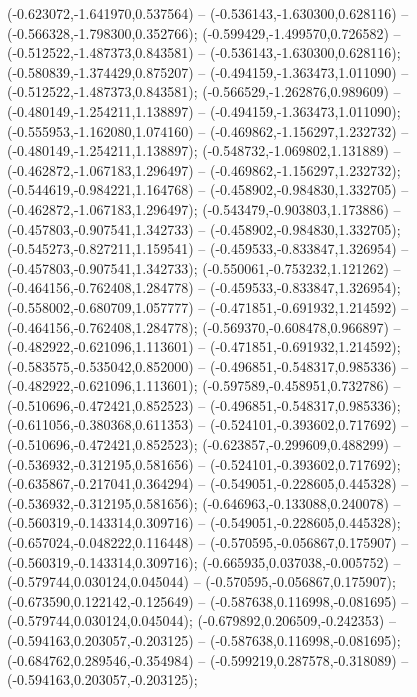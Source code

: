  (-0.623072,-1.641970,0.537564) -- (-0.536143,-1.630300,0.628116) -- (-0.566328,-1.798300,0.352766);
 (-0.599429,-1.499570,0.726582) -- (-0.512522,-1.487373,0.843581) -- (-0.536143,-1.630300,0.628116);
 (-0.580839,-1.374429,0.875207) -- (-0.494159,-1.363473,1.011090) -- (-0.512522,-1.487373,0.843581);
 (-0.566529,-1.262876,0.989609) -- (-0.480149,-1.254211,1.138897) -- (-0.494159,-1.363473,1.011090);
 (-0.555953,-1.162080,1.074160) -- (-0.469862,-1.156297,1.232732) -- (-0.480149,-1.254211,1.138897);
 (-0.548732,-1.069802,1.131889) -- (-0.462872,-1.067183,1.296497) -- (-0.469862,-1.156297,1.232732);
 (-0.544619,-0.984221,1.164768) -- (-0.458902,-0.984830,1.332705) -- (-0.462872,-1.067183,1.296497);
 (-0.543479,-0.903803,1.173886) -- (-0.457803,-0.907541,1.342733) -- (-0.458902,-0.984830,1.332705);
 (-0.545273,-0.827211,1.159541) -- (-0.459533,-0.833847,1.326954) -- (-0.457803,-0.907541,1.342733);
 (-0.550061,-0.753232,1.121262) -- (-0.464156,-0.762408,1.284778) -- (-0.459533,-0.833847,1.326954);
 (-0.558002,-0.680709,1.057777) -- (-0.471851,-0.691932,1.214592) -- (-0.464156,-0.762408,1.284778);
 (-0.569370,-0.608478,0.966897) -- (-0.482922,-0.621096,1.113601) -- (-0.471851,-0.691932,1.214592);
 (-0.583575,-0.535042,0.852000) -- (-0.496851,-0.548317,0.985336) -- (-0.482922,-0.621096,1.113601);
 (-0.597589,-0.458951,0.732786) -- (-0.510696,-0.472421,0.852523) -- (-0.496851,-0.548317,0.985336);
 (-0.611056,-0.380368,0.611353) -- (-0.524101,-0.393602,0.717692) -- (-0.510696,-0.472421,0.852523);
 (-0.623857,-0.299609,0.488299) -- (-0.536932,-0.312195,0.581656) -- (-0.524101,-0.393602,0.717692);
 (-0.635867,-0.217041,0.364294) -- (-0.549051,-0.228605,0.445328) -- (-0.536932,-0.312195,0.581656);
 (-0.646963,-0.133088,0.240078) -- (-0.560319,-0.143314,0.309716) -- (-0.549051,-0.228605,0.445328);
 (-0.657024,-0.048222,0.116448) -- (-0.570595,-0.056867,0.175907) -- (-0.560319,-0.143314,0.309716);
 (-0.665935,0.037038,-0.005752) -- (-0.579744,0.030124,0.045044) -- (-0.570595,-0.056867,0.175907);
 (-0.673590,0.122142,-0.125649) -- (-0.587638,0.116998,-0.081695) -- (-0.579744,0.030124,0.045044);
 (-0.679892,0.206509,-0.242353) -- (-0.594163,0.203057,-0.203125) -- (-0.587638,0.116998,-0.081695);
 (-0.684762,0.289546,-0.354984) -- (-0.599219,0.287578,-0.318089) -- (-0.594163,0.203057,-0.203125);
